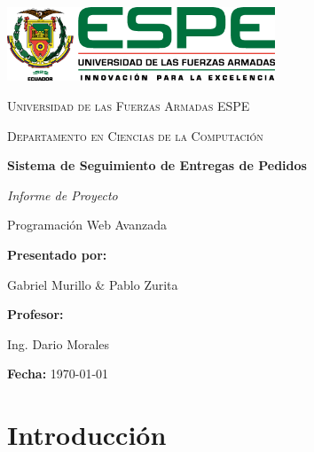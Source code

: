 \documentclass[a4paper,12pt]{article}
\begin{document}
\begin{titlepage}
    \centering
    \includegraphics[width=8cm]{espe_logo.png}\par
    \vspace{0.5cm}

    {\scshape\LARGE Universidad de las Fuerzas Armadas ESPE\par}
    \vspace{0.3cm}
    {\scshape\Large Departamento en Ciencias de la Computación\par}

    \vspace{2.5cm}

    {\Huge\bfseries Sistema de Seguimiento de Entregas de Pedidos\par}
    \vspace{0.5cm}
    {\Large\itshape Informe de Proyecto\par}

    \vspace{2cm}


    {\large Programación Web Avanzada\par}
    
    \vspace{0.8cm}
    {\large\textbf{Presentado por:}\par}
    {\large Gabriel Murillo \& Pablo Zurita\par}

    \vspace{0.8cm}



    {\large\textbf{Profesor:}\par}
    {\large Ing. Dario Morales\par}

    \vfill

    {\large\textbf{Fecha:} \today\par}
\end{titlepage}

\tableofcontents
\newpage

\section{Introducción}
\end{document}
